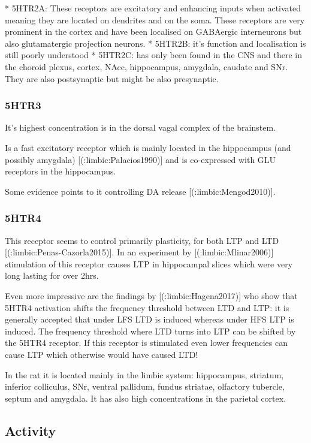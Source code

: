 {{  * 5HTR2A: These receptors are excitatory and enhancing inputs when activated meaning they are located on dendrites and on the soma. These receptors are very prominent in the cortex and have been localised on GABAergic interneurons but also glutamatergic projection neurons.
  * 5HTR2B: it's function and localisation is still poorly understood
  * 5HTR2C: has only been found in the CNS and there in the choroid plexus, cortex, NAcc, hippocampus, amygdala, caudate and SNr. They are also postsynaptic but might be also presynaptic.

\subsubsection{5HTR3}

It's highest concentration is in the dorsal vagal complex of the brainstem. 

Is a fast excitatory receptor which is mainly located in the hippocampus (and possibly amygdala) [(:limbic:Palacios1990)] and is co-expressed with GLU receptors in the hippocampus.

Some evidence points to it controlling DA release [(:limbic:Mengod2010)].

\subsubsection{5HTR4}

This receptor seems to control primarily plasticity, for both LTP and LTD [(:limbic:Penas-Cazorla2015)]. In an experiment by [(:limbic:Mlinar2006)] stimulation of this receptor causes LTP in hippocampal slices which were very long lasting for over 2hrs.

Even more impressive are the findings by [(:limbic:Hagena2017)] who show that 5HTR4 activation shifts the frequency threshold between LTD and LTP: it is generally accepted that under LFS LTD is induced whereas under HFS LTP is induced. The frequency threshold where LTD turns into LTP can be shifted by the 5HTR4 receptor. If this receptor is stimulated even lower frequencies can cause LTP which otherwise would have caused LTD!

In the rat it is located mainly in the limbic system: hippocampus, striatum, inferior colliculus, SNr, ventral pallidum, fundus striatae, olfactory tubercle, septum and amygdala. It has also high concentrations in the parietal cortex.




\subsection{Activity}

}}
